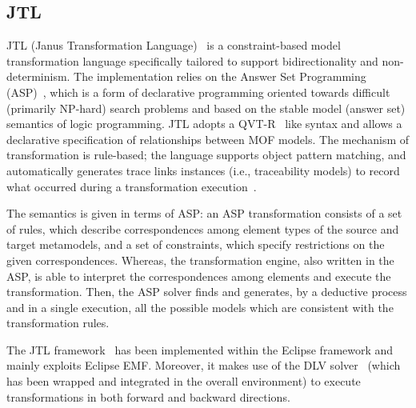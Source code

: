 \subsection{JTL}
\label{sec:JTL}


JTL (Janus Transformation Language)~\cite{CDEP10} is a constraint-based model transformation language specifically tailored to support bidirectionality and non-determinism. The implementation relies on the Answer Set Programming (ASP)~\cite{GL88}, which is a form of declarative programming oriented towards difficult (primarily NP-hard) search problems and based on the stable model (answer set) semantics of logic programming. 
JTL adopts a QVT-R~\cite{QVT-1.3} like syntax and allows a declarative specification of relationships between MOF models. The mechanism of transformation is rule-based; the language supports object pattern matching, and automatically generates trace links instances (i.e., traceability models) to record what occurred during a transformation execution~\cite{EPT18}. %

The semantics is given in terms of ASP: an ASP transformation consists of a set of rules, which describe correspondences among element types of the source and target metamodels, and a set of constraints, which specify restrictions on the given correspondences.  Whereas, the transformation engine, also written in the ASP, is able to interpret the correspondences among elements and execute the transformation. Then, the ASP solver finds and generates, by a deductive process and in a single execution, all the possible models which are consistent with the transformation rules. 
 

The JTL framework~\cite{ErPT18}
has been implemented within the Eclipse framework and mainly exploits Eclipse EMF. Moreover, it makes use of the DLV
solver~\cite{DLV} (which has been wrapped and integrated in the overall environment) to execute transformations in both forward and backward directions.


